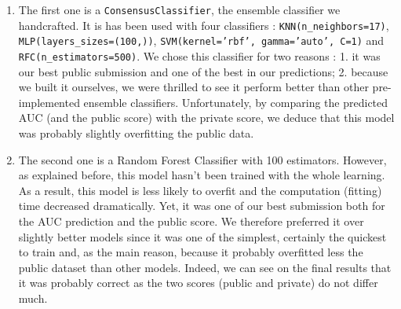 \begin{enumerate}
    \item The first one is a \texttt{ConsensusClassifier}, the ensemble classifier we handcrafted. It is has been used with four classifiers : \texttt{KNN(n\_neighbors=17)}, \texttt{MLP(layers\_sizes=(100,))}, \texttt{SVM(kernel='rbf', gamma='auto', C=1)} and \texttt{RFC(n\_estimators=500)}. We chose this classifier for two reasons : 1. it was our best public submission and one of the best in our predictions; 2. because we built it ourselves, we were thrilled to see it perform better than other pre-implemented ensemble classifiers. Unfortunately, by comparing the predicted AUC (and the public score) with the private score, we deduce that this model was probably slightly overfitting the public data.
    \item The second one is a Random Forest Classifier with 100 estimators. However, as explained before\footnotemark[3], this model hasn't been trained with the whole learning. As a result, this model is less likely to overfit and the computation (fitting) time decreased dramatically. Yet, it was one of our best submission both for the AUC prediction and the public score. We therefore preferred it over slightly better models since it was one of the simplest, certainly the quickest to train and, as the main reason, because it probably overfitted less the public dataset than other models. Indeed, we can see on the final results that it was probably correct as the two scores (public and private) do not differ much.
\end{enumerate}
